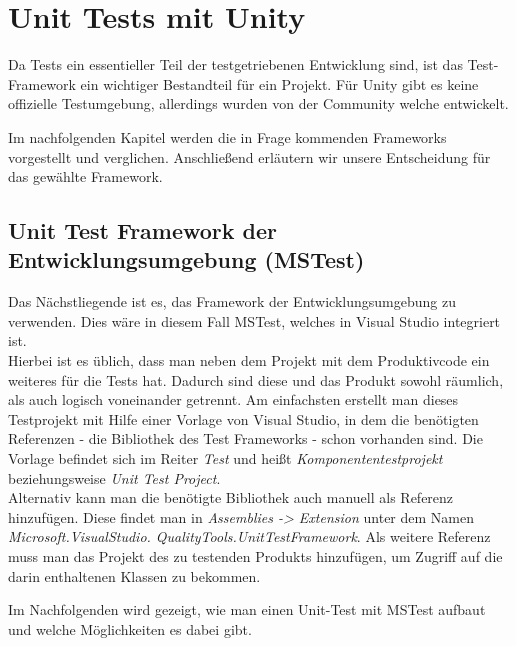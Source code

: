 \chapter{Unit Tests mit Unity}
\label{chap:Unit Tests mit Unity}

Da Tests ein essentieller Teil der testgetriebenen Entwicklung sind, ist das Test-Framework ein wichtiger Bestandteil für ein Projekt. Für Unity gibt es keine offizielle Testumgebung, allerdings wurden von der Community welche entwickelt.

Im nachfolgenden Kapitel werden die in Frage kommenden Frameworks vorgestellt und verglichen. Anschließend erläutern wir unsere Entscheidung für das gewählte Framework.

\section{Unit Test Framework der Entwicklungsumgebung (MSTest)}

Das Nächstliegende ist es, das Framework der Entwicklungsumgebung zu verwenden. Dies wäre in diesem Fall MSTest, welches in Visual Studio integriert ist.\\
Hierbei ist es üblich, dass man neben dem Projekt mit dem Produktivcode ein weiteres für die Tests hat. Dadurch sind diese und das Produkt sowohl räumlich, als auch logisch voneinander getrennt. Am einfachsten erstellt man dieses Testprojekt mit Hilfe einer Vorlage von Visual Studio, in dem die benötigten Referenzen - die Bibliothek des Test Frameworks - schon vorhanden sind. Die Vorlage befindet sich im Reiter \textit{Test} und heißt \textit{Komponententestprojekt} beziehungsweise \textit{Unit Test Project}.\\
Alternativ kann man die benötigte Bibliothek auch manuell als Referenz hinzufügen. Diese findet man in \textit{Assemblies -> Extension} unter dem Namen \textit{Microsoft.VisualStudio. QualityTools.UnitTestFramework}. Als weitere Referenz muss man das Projekt des zu testenden Produkts hinzufügen, um Zugriff auf die darin enthaltenen Klassen zu bekommen.

Im Nachfolgenden wird gezeigt, wie man einen Unit-Test mit MSTest aufbaut und welche Möglichkeiten es dabei gibt.

